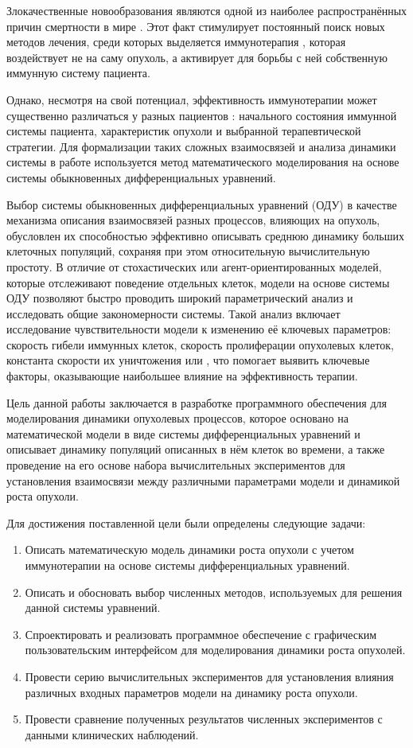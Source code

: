 \intro

Злокачественные новообразования являются одной из наиболее распространённых
причин смертности в мире \cite{major_death_causes}. Этот факт стимулирует
постоянный поиск новых методов лечения, среди которых выделяется иммунотерапия
\cite{immunotherapy_overview},
которая воздействует не на саму опухоль, а активирует для борьбы с ней
собственную иммунную систему пациента.

Однако, несмотря на свой потенциал, эффективность иммунотерапии может
существенно различаться у разных пациентов \cite{immunotherapy_efficacy}: начального
состояния иммунной системы пациента, характеристик опухоли и выбранной
терапевтической стратегии.
Для формализации таких сложных взаимосвязей и анализа динамики системы в работе
используется метод математического моделирования на основе системы обыкновенных
дифференциальных уравнений.

Выбор системы обыкновенных дифференциальных уравнений (ОДУ) в качестве механизма
описания взаимосвязей разных процессов, влияющих на опухоль, обусловлен их
способностью эффективно описывать среднюю динамику больших
клеточных популяций, сохраняя при этом относительную вычислительную простоту. В
отличие от стохастических или агент-ориентированных моделей, которые отслеживают
поведение отдельных клеток, модели на основе системы ОДУ позволяют быстро
проводить широкий параметрический анализ и исследовать общие закономерности
системы. Такой анализ включает исследование чувствительности
модели к изменению её ключевых параметров: скорость гибели иммунных
клеток, скорость пролиферации опухолевых клеток, константа скорости их
уничтожения или , что помогает выявить ключевые факторы, оказывающие наибольшее влияние на
эффективность терапии.

Цель данной работы заключается в разработке программного обеспечения для
моделирования динамики опухолевых процессов, которое основано на математической
модели в виде системы дифференциальных уравнений и описывает динамику популяций
описанных в нём клеток во времени, а также проведение на его основе набора
вычислительных экспериментов для установления взаимосвязи между различными
параметрами модели и динамикой роста опухоли.

Для достижения поставленной цели были определены следующие задачи:
\begin{enumerate}
  \item Описать математическую модель динамики роста опухоли с учетом иммунотерапии на
    основе системы дифференциальных уравнений.
  \item Описать и обосновать выбор численных методов, используемых для решения
    данной системы уравнений.
  \item Спроектировать и реализовать программное обеспечение с графическим
    пользовательским интерфейсом для моделирования динамики роста опухолей.
  \item Провести серию вычислительных экспериментов для установления влияния
    различных входных параметров модели на динамику роста опухоли.
  \item Провести сравнение полученных результатов численных экспериментов с данными
    клинических наблюдений.
\end{enumerate}
